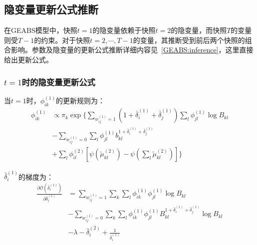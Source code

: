 \subsection{隐变量更新公式推断}

在GEABS模型中，快照$t=1$的隐变量依赖于快照$t=2$的隐变量，而快照$T$的变量则受$T-1$的约束。对于快照$t=2, \cdots, T-1$的变量，其推断受到前后两个快照的组合影响。参数及隐变量的更新公式推断详细内容见~\ref{GEABS:inference}，这里直接给出更新公式。
\subsubsection{$t=1$时的隐变量更新公式}
当$t=1$时，$\phi_{ik}^{(1)}$的更新规则为：
\begin{equation}
\begin{split}
\phi _{ik}^{(1)} & \propto \pi_k \exp\{ \sum_{w_{ij}^{(1)}=1} (1+\bar{\delta}_i^{(1)}+\bar{\delta}_j^{(1)}) \sum_l \phi_{jl}^{(1)} \log B_{kl} \\
& -\sum_{w_{ij}^{(1)}=0} \sum_l \phi_{jl}^{(1)}  b_{kl}^{1+\bar{\delta}_i^{(1)}+\bar{\delta}_j^{(1)}} \\
& + \sum_l \phi_{il}^{(2)}[\psi(\tilde{\mu}_{kl}^{(2)}) - \psi(\sum_l \tilde{\mu}_{kl}^{(2)})] \}
\end{split}
\end{equation}

$\bar{\delta}_i^{(1)}$的梯度为：
\begin{equation}
\begin{split}
\frac{\partial \mathscr{O}(\bar{\delta}_i^{(1)})}{\partial \bar{\delta}_i^{(1)}} & =\sum_{w_{ij}^{(1)}=1} \sum_k \sum_l \phi_{ik}^{(1)}\phi_{jl}^{(1)} \log B_{kl} \\
& -\sum_{w_{ij}^{(1)}=0} \sum_k \sum_l \phi_{ik}^{(1)}\phi_{jl}^{(1)}  B_{kl}^{1+\bar{\delta}_i^{(1)}+\bar{\delta}_j^{(1)}} \log B_{kl} \\
& -\lambda - \bar{\delta}_i^{(2)} + \frac{1}{\bar{\delta}_i^{(1)}}
\end{split}
\label{eq:delta1}
\end{equation}

